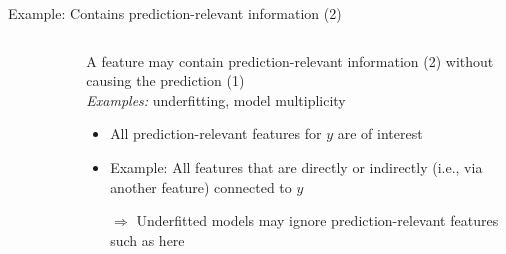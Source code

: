 \begin{frame}[c]{Example: Contains prediction-relevant information (2)}
\begin{columns}[c]
\begin{column}{0.5\textwidth}
\begin{figure}
\end{figure} 
  \end{column}
  \begin{column}{0.5\textwidth}
  A feature may contain prediction-relevant information (2) without causing the prediction (1)\\ 
  \textit{Examples:} underfitting, model multiplicity
  \lz
  \pause
      \begin{itemize}
      \item All prediction-relevant features for $y$ are of interest
      \item Example: All features that are directly or indirectly (i.e., via another feature) connected to $y$ 
      \item[$\Rightarrow$] Underfitted models may ignore prediction-relevant features such as  here
  \end{itemize}
  \end{column}
\end{columns}
\end{frame}

